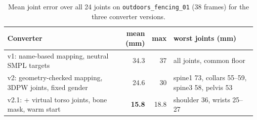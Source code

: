 
\begin{table}[h]
\centering\small
\begin{tabular}{p{5.6cm}rrp{4.6cm}}
\toprule
Converter & mean (mm) & max & worst joints (mm) \\
\midrule
v1: name-based mapping, neutral SMPL targets & 34.3 & 37 & all joints, common floor \\
v2: geometry-checked mapping, 3DPW joints, fixed gender & 24.6 & 30 & spine1 73, collars 55--59, spine3 58, pelvis 53 \\
v2.1: + virtual torso joints, bone mask, warm start & \textbf{15.8} & 18.8 & shoulder 36, wrists 25--27 \\
\bottomrule
\end{tabular}
\caption{Mean joint error over all 24 joints on \texttt{outdoors\_fencing\_01}
(38 frames) for the three converter versions.}
\label{tab:fit_versions}
\end{table}
